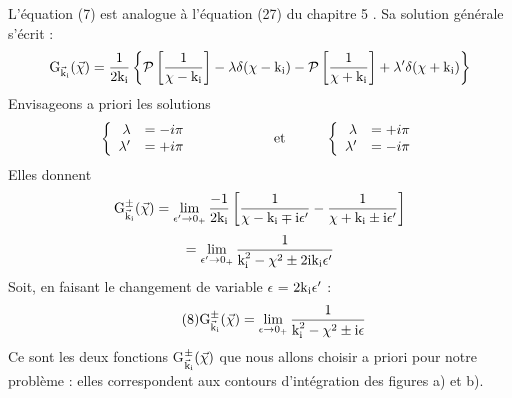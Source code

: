 L'équation (7) est analogue à l'équation (27) du chapitre 5
. Sa solution générale s'écrit :
\[
\text{G}_{\vec{\text{k}}_{\text{i}}}(\vec{\chi})=\frac{1}{2\text{k}_{\text{i}}}\left\{\mathcal{P}\left[\frac{1}{\chi-\text{k}_{\text{i}}}\right]-\lambda\delta(\chi-\text{k}_{\text{i}})
-\mathcal{P}\left[\frac{1}{\chi+\text{k}_{\text{i}}}\right]+\lambda'\delta(\chi+\text{k}_{\text{i}})\right\}
\]
Envisageons a priori les solutions
\[
\left\{
\begin{array}{rl}
\lambda & =-i\pi \\
\lambda' & =+i\pi
\end{array}
\right.
\hspace{2cm}\text{et}\hspace{1cm}
\left\{
\begin{array}{rl}
\lambda & =+i\pi \\
\lambda' & =-i\pi
\end{array}
\right.
\]
Elles donnent
\[
\text{G}_{\vec{\text{k}}_{\text{i}}}^\pm(\vec{\chi})=\lim_{\epsilon'\to 0_+}\frac{-1}{2\text{k}_{\text{i}}}\left[\frac{1}{\chi-\text{k}_{\text{i}}\mp\text{i}\epsilon'}-\frac{1}{\chi+\text{k}_{\text{i}}\pm\text{i}\epsilon'}\right]
\]
\[
=\lim_{\epsilon'\to 0_+}\frac{1}{\text{k}_{\text{i}}^2-\chi^2\pm 2\text{i}\text{k}_{\text{i}}\epsilon'}
\]
Soit, en faisant le changement de variable $\epsilon$ = $2\text{k}_{\text{i}}\epsilon'$ :
\[
\tag{8}\text{G}_{\vec{\text{k}}_{\text{i}}}^\pm(\vec{\chi})=\lim_{\epsilon\to 0_+}\frac{1}{\text{k}_{\text{i}}^2-\chi^2\pm \text{i}\epsilon}
\]
Ce sont les deux fonctions G$_{\vec{\text{k}}_{\text{i}}}^\pm(\vec{\chi})$ que nous allons choisir a priori pour
notre problème : elles correspondent aux contours d'intégration des figures a) et b).


